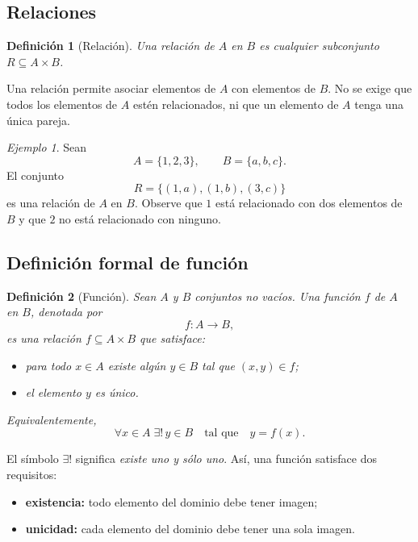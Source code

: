 \documentclass[12pt]{article}
\newtheorem{definicion}{Definición}[section]
\theoremstyle{remark}
\newtheorem{ejemplo}{Ejemplo}[section]
\begin{document}
\subsection*{Relaciones}
\begin{definicion}[Relación]
Una relación de $A$ en $B$ es cualquier subconjunto $R\subseteq A\times B$.
\end{definicion}

Una relación permite asociar elementos de $A$ con elementos de $B$. No se
exige que todos los elementos de $A$ estén relacionados, ni que un elemento de $A$ tenga una única pareja.

\begin{ejemplo}
Sean
\[
A=\{1,2,3\},\qquad B=\{a,b,c\}.
\]
El conjunto
\[
R=\{(1,a),(1,b),(3,c)\}
\]
es una relación de $A$ en $B$. Observe que $1$ está relacionado con dos
elementos de $B$ y que $2$ no está relacionado con ninguno.
\end{ejemplo}

\subsection{Definición formal de función}
\begin{definicion}[Función]
Sean $A$ y $B$ conjuntos no vacíos. Una \emph{función} $f$ de $A$ en $B$,
denotada por
\[
f:A\longrightarrow B,
\]
es una relación $f\subseteq A\times B$ que satisface:

\begin{itemize}
    \item para todo $x\in A$ existe algún $y\in B$ tal que $(x,y)\in f$;
    \item el elemento $y$ es único.
\end{itemize}

Equivalentemente,
\[
\forall x\in A\;\exists!\,y\in B
\quad\text{tal que}\quad y=f(x).
\]
\end{definicion}

El símbolo $\exists!$ significa \textit{existe uno y sólo uno}. Así, una función satisface dos requisitos:

\begin{itemize}
    \item \textbf{existencia:} todo elemento del dominio debe tener imagen;
    \item \textbf{unicidad:} cada elemento del dominio debe tener una sola imagen.
\end{itemize}
\end{document}
